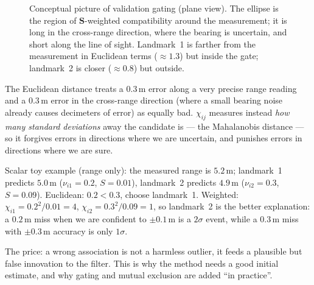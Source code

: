 \documentclass[11pt,a4paper]{article}
\theoremstyle{definition}
\theoremstyle{plain}
\theoremstyle{remark}
\newcommand{\robot}[3][fill=white]{\begin{scope}[shift={(#2)},rotate=#3]\draw[#1,thick] (0.24,0)--(-0.16,0.15)--(-0.16,-0.15)--cycle;\end{scope}}
\begin{document}
\begin{figure}[H]
\centering
{}
\caption{Conceptual picture of validation gating (plane view). The ellipse is the region of $\bm S$-weighted compatibility around the measurement; it is long in the cross-range direction, where the bearing is uncertain, and short along the line of sight. Landmark~1 is farther from the measurement in Euclidean terms ($\approx1.3$) but inside the gate; landmark~2 is closer ($\approx0.8$) but outside.}
\label{fig:gating}
\end{figure}

\begin{intuition}
The Euclidean distance treats a $0.3$\,m error along a very precise range reading and a $0.3$\,m error in the cross-range direction (where a small bearing noise already causes decimeters of error) as equally bad. $\chi_{ij}$ measures instead \emph{how many standard deviations} away the candidate is --- the Mahalanobis distance --- so it forgives errors in directions where we are uncertain, and punishes errors in directions where we are sure.

Scalar toy example (range only): the measured range is $5.2$\,m; landmark~1 predicts $5.0$\,m ($\nu_{i1}=0.2$, $S=0.01$), landmark~2 predicts $4.9$\,m ($\nu_{i2}=0.3$, $S=0.09$). Euclidean: $0.2<0.3$, choose landmark~1. Weighted: $\chi_{i1}=0.2^2/0.01=4$, $\chi_{i2}=0.3^2/0.09=1$, so landmark~2 is the better explanation: a $0.2$\,m miss when we are confident to $\pm0.1$\,m is a $2\sigma$ event, while a $0.3$\,m miss with $\pm0.3$\,m accuracy is only $1\sigma$.

The price: a wrong association is not a harmless outlier, it feeds a plausible but false innovation to the filter. This is why the method needs a good initial estimate, and why gating and mutual exclusion are added ``in practice''.
\end{intuition}
\end{document}
